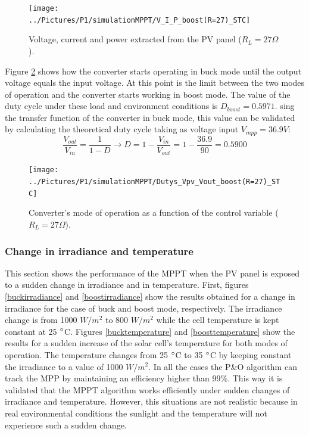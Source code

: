 \begin{figure}[H]
	\begin{center}
		\texttt{[image: ../Pictures/P1/simulationMPPT/V\_I\_P\_boost(R=27)\_STC]}
		\caption{Voltage, current and power extracted from the PV panel ($R_{L}=27\Omega$).}
		\label{boostSTC} 
	\end{center}	
\end{figure}

Figure \ref{boostSTC_duty} shows how the converter starts operating in buck mode until the output voltage equals the input voltage. At this point is the limit between the two modes of operation and the converter starts working in boost mode. The value of the duty cycle under these load and environment conditions is $D_{boost}= 0.5971$. sing the transfer function of the converter in  buck mode, this value can be validated by calculating the theoretical duty cycle taking as voltage input $V_{mpp}=36.9 V$: 
\begin{equation}
\frac{V_{out}}{V_{in}}= \frac{1}{1-D} \rightarrow D = 1 - \frac{V_{in}}{V_{out}} = 1 - \frac{36.9}{90} = 0.5900
\end{equation}
 
\begin{figure}[H]
	\begin{center}
		\texttt{[image: ../Pictures/P1/simulationMPPT/Dutys\_Vpv\_Vout\_boost(R=27)\_STC]}
		\caption{Converter's mode of operation as a function of the control variable ($R_{L}=27\Omega$).}
		\label{boostSTC_duty} 
	\end{center}	
\end{figure}

\subsubsection*{Change in irradiance and temperature}

This section shows the performance of the MPPT when the PV panel is exposed to a sudden change in irradiance and in temperature. First, figures \ref{buckirradiance} and \ref{boostirradiance} show the results obtained for a change in irradiance for the case of buck and boost mode, respectively. The irradiance change is from 1000 $W/ m^2$ to 800 $W/ m^2$ while the cell temperature is kept constant at 25 $\dec$C. 
Figures \ref{bucktemperature} and \ref{boosttemperature}  show the results for a sudden increase of the solar cell's temperature for both modes of operation. The temperature changes from 25 $\dec$C to 35 $\dec$C by keeping constant the irradiance to a value of 1000 $W/ m^2$. 
In all the cases the P\&O algorithm can track the MPP by maintaining an efficiency higher than 99\%. This way it is validated that the MPPT algorithm works efficiently under sudden changes of irradiance and temperature. However, this situations are not realistic because in real environmental conditions the sunlight and the temperature will not experience such a sudden change. 

